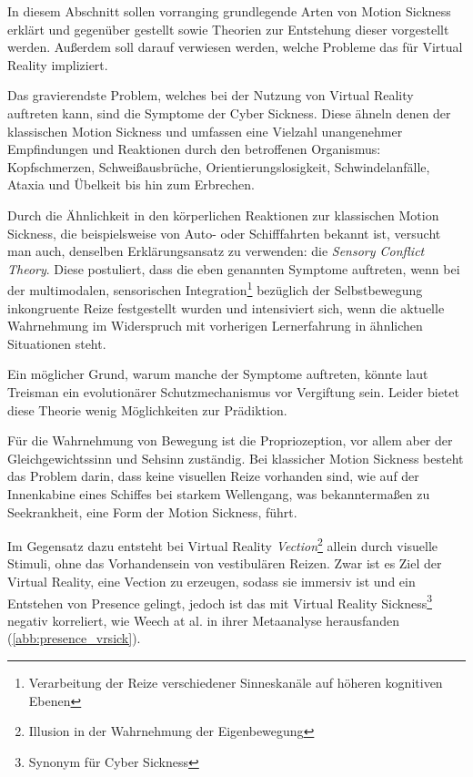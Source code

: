 In diesem Abschnitt sollen vorranging grundlegende Arten von Motion Sickness erkl\"art und gegen\"uber gestellt sowie Theorien zur Entstehung dieser vorgestellt werden. Au{\ss}erdem soll darauf verwiesen werden, welche Probleme das f\"ur Virtual Reality impliziert.

Das gravierendste Problem, welches bei der Nutzung von Virtual Reality auftreten kann, sind die Symptome der Cyber Sickness. Diese \"ahneln denen der klassischen Motion Sickness und umfassen eine Vielzahl unangenehmer Empfindungen und Reaktionen durch den betroffenen Organismus: Kopfschmerzen, Schwei{\ss}ausbr\"uche, Orientierungslosigkeit, Schwindelanf\"alle, Ataxia und \"Ubelkeit bis hin zum Erbrechen\cite{LaViola:2000:CSinVR, Kolasinski:1998:SympCS}.

Durch die \"Ahnlichkeit in den k\"orperlichen Reaktionen zur klassischen Motion Sickness, die beispielsweise von Auto- oder Schifffahrten bekannt ist, versucht man auch, denselben Erkl\"arungsansatz zu verwenden: die \textit{Sensory Conflict Theory}\cite{Kolasinski:1998:SympCS,Johnson:2005:SCT_Expl}.
Diese postuliert, dass die eben genannten Symptome auftreten, wenn bei der multimodalen, sensorischen Integration\footnote{ Verarbeitung der Reize verschiedener Sinneskan\"ale auf h\"oheren kognitiven Ebenen} bez\"uglich der Selbstbewegung inkongruente Reize festgestellt wurden und intensiviert sich, wenn die aktuelle Wahrnehmung im Widerspruch mit vorherigen Lernerfahrung in \"ahnlichen Situationen steht\cite{Reason:1975:MSexp}.

Ein m\"oglicher Grund, warum manche der Symptome auftreten, k\"onnte laut Treisman\cite{Treisman:1977:Toxic} ein evolution\"arer Schutzmechanismus vor Vergiftung sein. Leider bietet diese Theorie wenig M\"oglichkeiten zur Pr\"adiktion.

F\"ur die Wahrnehmung von Bewegung ist die Propriozeption, vor allem aber der Gleichgewichtssinn und Sehsinn zust\"andig.
Bei klassicher Motion Sickness besteht das Problem darin, dass keine visuellen Reize vorhanden sind, wie auf der Innenkabine eines Schiffes bei starkem Wellengang, was bekannterma{\ss}en zu Seekrankheit, eine Form der Motion Sickness, f\"uhrt.

Im Gegensatz dazu entsteht bei Virtual Reality \textit{Vection}\footnote{ Illusion in der Wahrnehmung der Eigenbewegung} allein durch visuelle Stimuli, ohne das Vorhandensein von vestibul\"aren Reizen.
Zwar ist es Ziel der Virtual Reality, eine Vection zu erzeugen, sodass sie immersiv ist und ein Entstehen von Presence gelingt, jedoch ist das mit Virtual Reality Sickness\footnote{Synonym f\"ur Cyber Sickness} negativ korreliert, wie Weech at al.\cite{Weech:2019:PresenceCS} in ihrer Metaanalyse herausfanden (\autoref{abb:presence_vrsick}).

